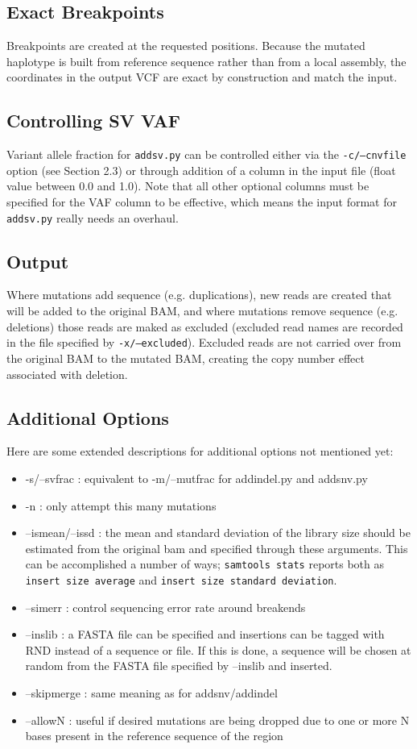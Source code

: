 \documentclass[letterpaper,11pt]{article}
\begin{document}
\subsection{Exact Breakpoints}
Breakpoints are created at the requested positions. Because the mutated haplotype is built from reference sequence rather than from a local assembly, the coordinates in the output VCF are exact by construction and match the input.

\subsection{Controlling SV VAF}
Variant allele fraction for \texttt{addsv.py} can be controlled either via the \texttt{-c/--cnvfile} option (see Section 2.3) or through addition of a column in the input file (float value between 0.0 and 1.0). Note that all other optional columns must be specified for the VAF column to be effective, which means the input format for \texttt{addsv.py} really needs an overhaul.

\subsection{Output}
    Where mutations add sequence (e.g. duplications), new reads are created that will be added to the original BAM, and where mutations remove sequence (e.g. deletions) those reads are maked as excluded (excluded read names are recorded in the file specified by \texttt{-x/--excluded}). Excluded reads are not carried over from the original BAM to the mutated BAM, creating the copy number effect associated with deletion.     
     
\subsection{Additional Options}
Here are some extended descriptions for additional options not mentioned yet:
     
\begin{itemize}
\item -s/--svfrac : equivalent to -m/--mutfrac for addindel.py and addsnv.py
\item -n : only attempt this many mutations
\item --ismean/--issd : the mean and standard deviation of the library size should be estimated from the original bam and specified through these arguments. This can be accomplished a number of ways; \texttt{samtools stats} reports both as \texttt{insert size average} and \texttt{insert size standard deviation}.
\item --simerr : control sequencing error rate around breakends
\item --inslib : a FASTA file can be specified and insertions can be tagged with RND instead of a sequence or file. If this is done, a sequence will be chosen at random from the FASTA file specified by --inslib and inserted.
\item --skipmerge : same meaning as for addsnv/addindel
\item --allowN : useful if desired mutations are being dropped due to one or more N bases present in the reference sequence of the region
\end{itemize}
\end{document}
